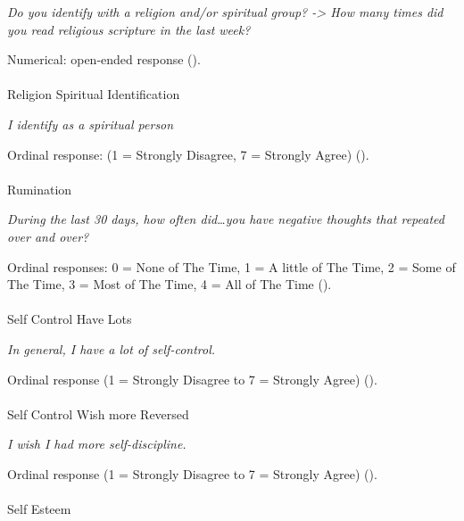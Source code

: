 \documentclass[
  single column]{article}
\makeatletter
\let\oldparagraph\paragraph
\renewcommand{\paragraph}{
    \@ifstar
      \xxxParagraphStar
      \xxxParagraphNoStar
  }
\newcommand{\xxxParagraphStar}[1]{\oldparagraph*{#1}\mbox{}}
\newcommand{\xxxParagraphNoStar}[1]{\oldparagraph{#1}\mbox{}}
\makeatother
\begin{document}
\emph{Do you identify with a religion and/or spiritual group?
-\textgreater{} How many times did you read religious scripture in the
last week?}

Numerical: open-ended response ().

\paragraph{Religion Spiritual
Identification}\label{religion-spiritual-identification}

\emph{I identify as a spiritual person}

Ordinal response: (1 = Strongly Disagree, 7 = Strongly Agree)
().

\paragraph{Rumination}\label{rumination-1}

\emph{During the last 30 days, how often did\ldots you have negative
thoughts that repeated over and over?}

Ordinal responses: 0 = None of The Time, 1 = A little of The Time, 2 =
Some of The Time, 3 = Most of The Time, 4 = All of The Time
().

\paragraph{Self Control Have Lots}\label{self-control-have-lots}

\emph{In general, I have a lot of self-control.}

Ordinal response (1 = Strongly Disagree to 7 = Strongly Agree)
().

\paragraph{Self Control Wish more
Reversed}\label{self-control-wish-more-reversed}

\emph{I wish I had more self-discipline.}

Ordinal response (1 = Strongly Disagree to 7 = Strongly Agree)
().

\paragraph{Self Esteem}\label{self-esteem-1}
\end{document}
